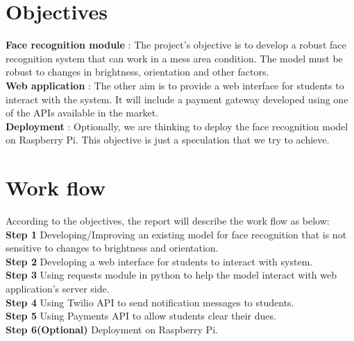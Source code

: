 \section{Objectives}
\textbf{Face recognition module} : The project's objective is to develop a robust face recognition system that can work in a mess area condition. The model must be robust to changes in brightness, orientation and other factors. \\
\textbf{Web application} : The other aim is to provide a web interface for students to interact with the system. It will include a payment gateway developed using one of the APIs available in the market.\\
\textbf{Deployment} : Optionally, we are thinking to deploy the face recognition model on Raspberry Pi. This objective is just a speculation that we try to achieve.


\section{Work flow}
According to the objectives, the report will describe the work flow as below: \\
\textbf{Step 1} Developing/Improving an existing model for face recognition that is not sensitive to changes to brightness and orientation. \\
\textbf{Step 2} Developing a web interface for students to interact with system. \\
\textbf{Step 3} Using requests module in python to help the model interact with web application's server side. \\
\textbf{Step 4} Using Twilio API to send notification messages to students. \\
\textbf{Step 5} Using Payments API to allow students clear their dues.\\
\textbf{Step 6(Optional)} Deployment on Raspberry Pi.
